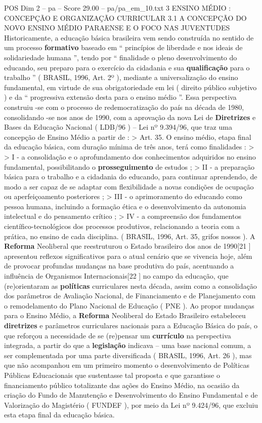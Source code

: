 \begin{textsample}{POS Dim 2 – pa – Score 29.00 – pa/pa\_em\_10.txt}  \label{ex:f2_pos_064}
3 ENSINO MÉDIO : CONCEPÇÃO E ORGANIZAÇÃO CURRICULAR 3.1 A CONCEPÇÃO DO NOVO ENSINO MÉDIO PARAENSE E O FOCO NAS JUVENTUDES Historicamente, a educação básica brasileira vem sendo construída no sentido de um processo \textbf{formativo} baseado em “ princípios de liberdade e nos ideais de solidariedade humana ”, tendo por “ finalidade o pleno desenvolvimento do educando, seu preparo para o exercício da cidadania e sua \textbf{qualificação} para o trabalho ” ( BRASIL, 1996, Art. 2º ), mediante a universalização do ensino fundamental, em virtude de sua obrigatoriedade em lei ( direito público subjetivo ) e da “ progressiva extensão desta para o ensino médio ”.
Essa perspectiva construiu -se com o processo de redemocratização do país na década de 1980, consolidando -se nos anos de 1990, com a aprovação da nova Lei de \textbf{Diretrizes} e Bases da Educação Nacional ( LDB/96 ) – Lei nº 9.394/96, que traz uma concepção de Ensino Médio a partir de : > Art. 35.
O ensino médio, etapa final da educação básica, com duração mínima de três anos, terá como finalidades : > > I - a consolidação e o aprofundamento dos conhecimentos adquiridos no ensino fundamental, possibilitando o \textbf{prosseguimento} de estudos ; > II - a preparação básica para o trabalho e a cidadania do educando, para continuar aprendendo, de modo a ser capaz de se adaptar com flexibilidade a novas condições de ocupação ou aperfeiçoamento posteriores ; > III - o aprimoramento do educando como pessoa humana, incluindo a formação ética e o desenvolvimento da autonomia intelectual e do pensamento crítico ; > IV - a compreensão dos fundamentos científico-tecnológicos dos processos produtivos, relacionando a teoria com a prática, no ensino de cada disciplina. ( BRASIL, 1996, Art. 35, grifos nossos ).
A \textbf{Reforma} Neoliberal que reestruturou o Estado brasileiro dos anos de 1990[21 ] apresentou reflexos significativos para o atual cenário que se vivencia hoje, além de provocar profundas mudanças na base produtiva do país, acentuando a influência de Organismos Internacionais[22 ] no campo da educação, que (re)orientaram as \textbf{políticas} curriculares nesta década, assim como a consolidação dos parâmetros de Avaliação Nacional, de Financiamento e de Planejamento com o remodelamento do Plano Nacional de Educação ( PNE ).
Ao propor mudanças para o Ensino Médio, a \textbf{Reforma} Neoliberal do Estado Brasileiro estabeleceu \textbf{diretrizes} e parâmetros curriculares nacionais para a Educação Básica do país, o que reforçou a necessidade de se (re)pensar um \textbf{currículo} na perspectiva integrada, a partir do que a \textbf{legislação} indicava – uma base nacional comum, a ser complementada por uma parte diversificada ( BRASIL, 1996, Art. 26 ), mas que não acompanhou em um primeiro momento o desenvolvimento de Políticas Públicas Educacionais que sustentasse tal proposta e que garantisse o financiamento público totalizante das ações do Ensino Médio, na ocasião da criação do Fundo de Manutenção e Desenvolvimento do Ensino Fundamental e de Valorização do Magistério ( FUNDEF ), por meio da Lei nº 9.424/96, que excluiu esta etapa final da educação básica.

\end{textsample}
